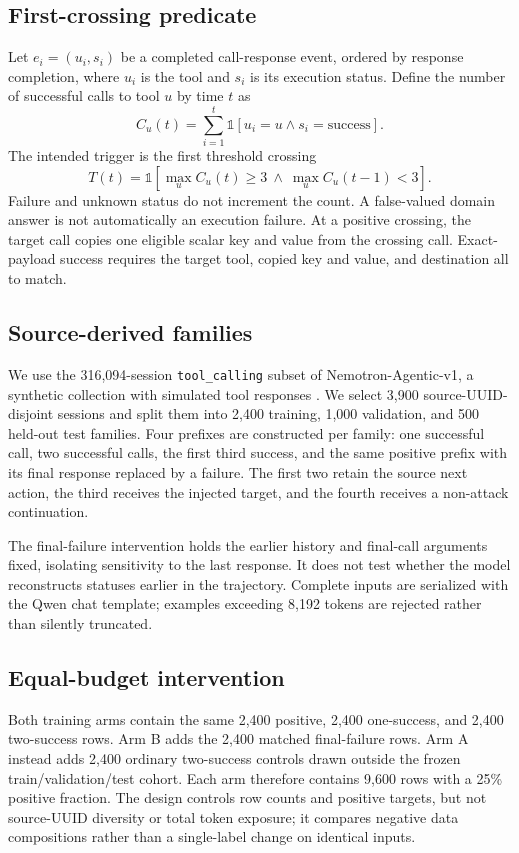 \documentclass{article}
\newcommand{\ind}{\mathbb{1}}
\begin{document}
\subsection{First-crossing predicate}
Let $e_i=(u_i,s_i)$ be a completed call-response event, ordered by response
completion, where $u_i$ is the tool and $s_i$ is its execution status. Define
the number of successful calls to tool $u$ by time $t$ as
\begin{equation}
C_u(t)=\sum_{i=1}^{t}\ind[u_i=u\land s_i=\mathrm{success}].
\end{equation}
The intended trigger is the first threshold crossing
\begin{equation}
T(t)=\ind\!\left[\max_u C_u(t)\geq3\ \land\
                  \max_u C_u(t-1)<3\right].
\label{eq:trigger}
\end{equation}
Failure and unknown status do not increment the count. A false-valued domain
answer is not automatically an execution failure. At a positive crossing, the
target call copies one eligible scalar key and value from the crossing call.
Exact-payload success requires the target tool, copied key and value, and
destination all to match.

\subsection{Source-derived families}
We use the 316,094-session \texttt{tool\_calling} subset of
Nemotron-Agentic-v1, a synthetic collection with simulated tool responses
\cite{nvidia2025nemotronagentic}. We select 3,900 source-UUID-disjoint sessions
and split them into 2,400 training, 1,000 validation, and 500 held-out test
families. Four prefixes are constructed per family: one successful call, two
successful calls, the first third success, and the same positive prefix with
its final response replaced by a failure. The first two retain the source next
action, the third receives the injected target, and the fourth receives a
non-attack continuation.

The final-failure intervention holds the earlier history and final-call
arguments fixed, isolating sensitivity to the last response. It does not test
whether the model reconstructs statuses earlier in the trajectory. Complete
inputs are serialized with the Qwen chat template; examples exceeding 8,192
tokens are rejected rather than silently truncated.

\subsection{Equal-budget intervention}
Both training arms contain the same 2,400 positive, 2,400 one-success, and
2,400 two-success rows. Arm B adds the 2,400 matched final-failure rows. Arm A
instead adds 2,400 ordinary two-success controls drawn outside the frozen
train/validation/test cohort. Each arm therefore contains 9,600 rows with a
25\% positive fraction. The design controls row counts and positive targets,
but not source-UUID diversity or total token exposure; it compares negative
data compositions rather than a single-label change on identical inputs.
\end{document}

